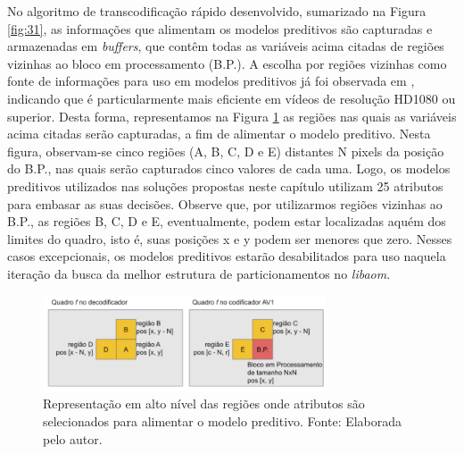 No algoritmo de transcodificação rápido desenvolvido, sumarizado na Figura \ref{fig:31}, as informações que alimentam os modelos preditivos são capturadas e armazenadas em \textit{buffers}, que contêm todas as variáveis acima citadas de regiões vizinhas ao bloco em processamento (B.P.). A escolha por regiões vizinhas como fonte de informações para uso em modelos preditivos já foi observada em \citet{bib:guo_2018}, indicando que é particularmente mais eficiente em vídeos de resolução HD1080 ou superior. Desta forma, representamos na Figura \ref{fig:32} as regiões nas quais as variáveis acima citadas serão capturadas, a fim de alimentar o modelo preditivo. Nesta figura, observam-se cinco regiões (A, B, C, D e E) distantes N pixels da posição do B.P., nas quais serão capturados cinco valores de cada uma. Logo, os modelos preditivos utilizados nas soluções propostas neste capítulo utilizam 25 atributos para embasar as suas decisões. Observe que, por utilizarmos regiões vizinhas ao B.P., as regiões B, C, D e E, eventualmente, podem estar localizadas aquém dos limites do quadro, isto é, suas posições x e y podem ser menores que zero. Nesses casos excepcionais, os modelos preditivos estarão desabilitados para uso naquela iteração da busca da melhor estrutura de particionamentos no \textit{libaom}.

\begin{figure}
    \centering
    \includegraphics[width=0.75\textwidth]{FIGURES/fig_32.png}
    \caption{Representação em alto nível das regiões onde atributos são selecionados para alimentar o modelo preditivo. Fonte: Elaborada pelo autor.}
    \label{fig:32}
\end{figure}

